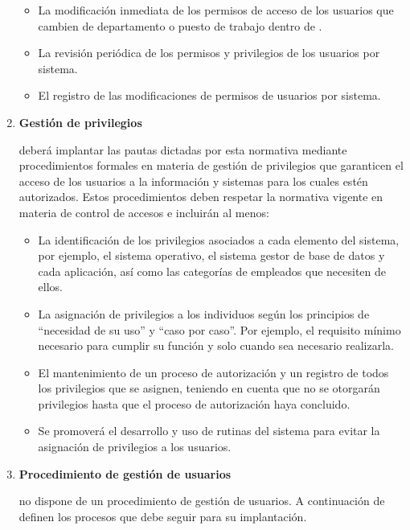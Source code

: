\begin{enumerate}[label=\alph*)]
    \begin{itemize}
        \item La modificación inmediata de los permisos de acceso de los usuarios que cambien de departamento o puesto de trabajo dentro de \Beneficiario{}.
        \item La revisión periódica de los permisos y privilegios de los usuarios por sistema.
        \item El registro de las modificaciones de permisos de usuarios por sistema.
    \end{itemize}

    \item \textbf{Gestión de privilegios}

    \Beneficiario{} deberá implantar las pautas dictadas por esta normativa mediante procedimientos formales en materia de gestión de privilegios que garanticen el acceso de los usuarios a la información y sistemas para los cuales estén autorizados. Estos procedimientos deben respetar la normativa vigente en materia de control de accesos e incluirán al menos:

    \begin{itemize}
        \item La identificación de los privilegios asociados a cada elemento del sistema, por ejemplo, el sistema operativo, el sistema gestor de base de datos y cada aplicación, así como las categorías de empleados que necesiten de ellos.
        \item La asignación de privilegios a los individuos según los principios de “necesidad de su uso” y “caso por caso”. Por ejemplo, el requisito mínimo necesario para cumplir su función y solo cuando sea necesario realizarla.
        \item El mantenimiento de un proceso de autorización y un registro de todos los privilegios que se asignen, teniendo en cuenta que no se otorgarán privilegios hasta que el proceso de autorización haya concluido.
        \item Se promoverá el desarrollo y uso de rutinas del sistema para evitar la asignación de privilegios a los usuarios.
    \end{itemize}

    \item \textbf{Procedimiento de gestión de usuarios}

    \Beneficiario{} no dispone de un procedimiento de gestión de usuarios. A continuación de definen los procesos que \Beneficiario{} debe seguir para su implantación.


\end{enumerate}
